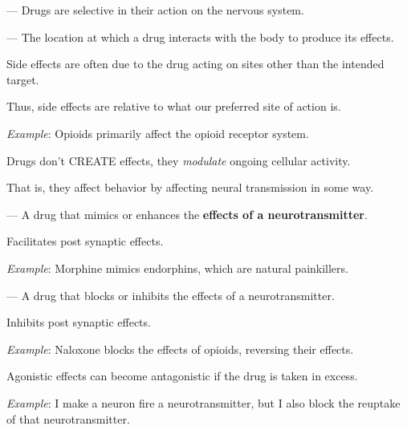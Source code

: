 \begin{coloredlist}
    \item {} — Drugs are selective in their action on the nervous system.
    \begin{coloredlist}
        \item {} — The location at which a drug interacts with the body to produce its effects.
        \item Side effects are often due to the drug acting on sites other than the intended target.
        \begin{coloredlist}
            \item Thus, side effects are relative to what our preferred site of action is.
        \end{coloredlist}
        \item \textit{Example}: Opioids primarily affect the opioid receptor system.
    \end{coloredlist}
    \item Drugs don't CREATE effects, they \textit{modulate} ongoing cellular activity.
    \begin{coloredlist}
        \item That is, they affect behavior by affecting neural transmission in some way.
        \item {} — A drug that mimics or enhances the \textbf{effects of a neurotransmitter}.
        \begin{coloredlist}
            \item Facilitates post synaptic effects.
            \item \textit{Example}: Morphine mimics endorphins, which are natural painkillers.
        \end{coloredlist}
        \item {} — A drug that blocks or inhibits the effects of a neurotransmitter.
        \begin{coloredlist}
            \item Inhibits post synaptic effects.
            \item \textit{Example}: Naloxone blocks the effects of opioids, reversing their effects.
        \end{coloredlist}
        \item Agonistic effects can become antagonistic if the drug is taken in excess.
        \begin{coloredlist}
            \item \textit{Example}: I make a neuron fire a neurotransmitter, but I also block the reuptake of that neurotransmitter.
        \end{coloredlist}
    \end{coloredlist}
\end{coloredlist}

